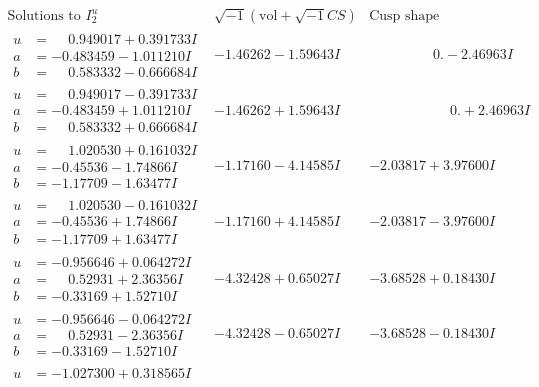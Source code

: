 \documentclass[1p]{elsarticle_modified}
\theoremstyle{definition}
\newcommand{\I}{\sqrt{-1}}
\begin{document}
$$\begin{array}{c|c|c}  
\text{Solutions to }I^u_{2}& \I (\text{vol} + \sqrt{-1}CS) & \text{Cusp shape}\\
 \hline 
\begin{aligned}
u &= \phantom{-}0.949017 + 0.391733 I \\
a &= -0.483459 - 1.011210 I \\
b &= \phantom{-}0.583332 - 0.666684 I\end{aligned}
 & -1.46262 - 1.59643 I & \phantom{-0.000000 } 0. - 2.46963 I \\ \hline\begin{aligned}
u &= \phantom{-}0.949017 - 0.391733 I \\
a &= -0.483459 + 1.011210 I \\
b &= \phantom{-}0.583332 + 0.666684 I\end{aligned}
 & -1.46262 + 1.59643 I & \phantom{-0.000000 -}0. + 2.46963 I \\ \hline\begin{aligned}
u &= \phantom{-}1.020530 + 0.161032 I \\
a &= -0.45536 - 1.74866 I \\
b &= -1.17709 - 1.63477 I\end{aligned}
 & -1.17160 - 4.14585 I & -2.03817 + 3.97600 I \\ \hline\begin{aligned}
u &= \phantom{-}1.020530 - 0.161032 I \\
a &= -0.45536 + 1.74866 I \\
b &= -1.17709 + 1.63477 I\end{aligned}
 & -1.17160 + 4.14585 I & -2.03817 - 3.97600 I \\ \hline\begin{aligned}
u &= -0.956646 + 0.064272 I \\
a &= \phantom{-}0.52931 + 2.36356 I \\
b &= -0.33169 + 1.52710 I\end{aligned}
 & -4.32428 + 0.65027 I & -3.68528 + 0.18430 I \\ \hline\begin{aligned}
u &= -0.956646 - 0.064272 I \\
a &= \phantom{-}0.52931 - 2.36356 I \\
b &= -0.33169 - 1.52710 I\end{aligned}
 & -4.32428 - 0.65027 I & -3.68528 - 0.18430 I \\ \hline\begin{aligned}
u &= -1.027300 + 0.318565 I \\

\end{aligned}
\end{array}$$
\end{document}
